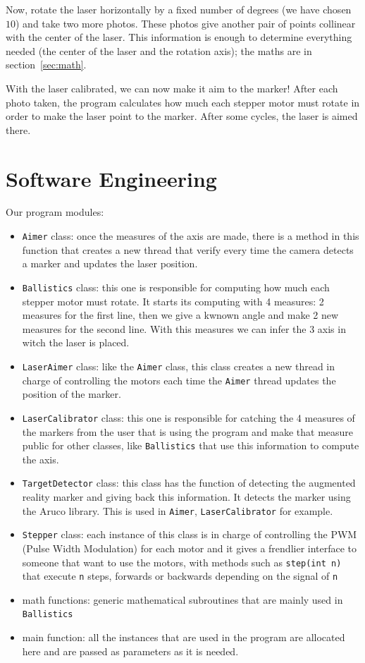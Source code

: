 \documentclass{article}
\newcommand\class[1]{\texttt{#1}}
\newcommand\method[1]{\texttt{#1}}
\begin{document}
Now, rotate the laser horizontally by a fixed number of degrees
(we have chosen $10$)
and take two more photos.
These photos give another pair of points collinear with the center of the laser.
This information is enough to determine everything needed
(the center of the laser and the rotation axis);
the maths are in section~\ref{sec:math}.

With the laser calibrated,
we can now make it aim to the marker!
After each photo taken,
the program calculates how much each stepper motor must rotate
in order to make the laser point to the marker.
After some cycles,
the laser is aimed there.

\section{Software Engineering}

Our program modules:
\begin{itemize}
    \item \class{Aimer} class: once the measures of the axis are made,
there is a method in this function that creates a new thread that verify
every time the camera detects a marker and updates the laser position.
    \item \class{Ballistics} class: this one is responsible for computing
how much each stepper motor must rotate. It starts its computing with
4 measures: 2 measures for the first line, then we give a kwnown angle and
make 2 new measures for the second line. With this measures we can infer 
the 3 axis in witch the laser is placed.
    \item \class{LaserAimer} class: like the \class{Aimer} class, this class
creates a new thread in charge of controlling the motors each time the 
\class{Aimer} thread updates the position of the marker.
    \item \class{LaserCalibrator} class: this one is responsible for catching
the 4 measures of the markers from the user that is using the program and make
that measure public for other classes, like \class{Ballistics} that use this
information to compute the axis.
    \item \class{TargetDetector} class: this class has the function of
detecting the augmented reality marker and giving back this information.
It detects the marker using the Aruco library.
This is used in \class{Aimer}, \class{LaserCalibrator} for example.
    \item \class{Stepper} class: each instance of this class is in charge of
controlling the PWM (Pulse Width Modulation) for each motor and it
gives a frendlier interface to someone that want to use the motors,
with methods such as \method{step(int n)} that execute \texttt{n} steps,
forwards or backwards depending on the signal of \texttt{n}
    \item math functions: generic mathematical subroutines that are mainly used in
\class{Ballistics} 
    \item main function: all the instances that are used in the program are
allocated here and are passed as parameters as it is needed. 
\end{itemize}
\end{document}
